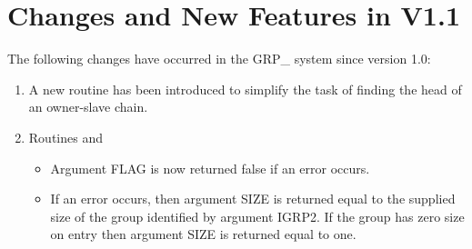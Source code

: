 \section{Changes and New Features in V1.1}
The following changes have occurred in the GRP\_ system since version 1.0:
\begin{enumerate}
\item A new routine  has been introduced to simplify the task of
finding the head of an owner-slave chain.
\item Routines  and 
\begin{itemize}
\item Argument FLAG is now returned false if an error occurs.
\item If an error occurs, then argument SIZE is returned equal to the supplied
size of the group identified by argument IGRP2. If the group has zero size on
entry then argument SIZE is returned equal to one.
\end{itemize}
\end{enumerate}


